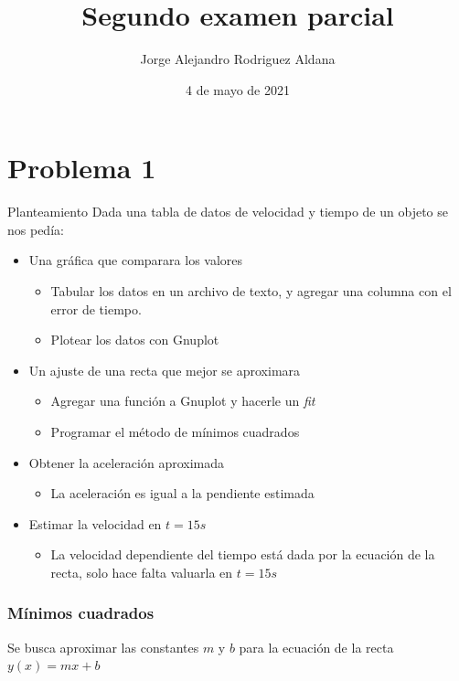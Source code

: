 \documentclass{beamer}
\title{Segundo examen parcial}
\date{4 de mayo de 2021}
\author{Jorge Alejandro Rodriguez Aldana}
\institute{Escuela de Ciencias físicas y matemáticas}
\begin{document}
\maketitle
\section{Problema 1}
\begin{frame}{Planteamiento}
Dada una tabla de datos de velocidad y tiempo de un objeto se nos pedía:

 \begin{itemize}[<+- | alert@+>]
    \item Una gráfica que comparara los valores
    \begin{itemize}
        \item Tabular los datos en un archivo de texto, y agregar una columna con el error de tiempo.
        \item Plotear los datos con Gnuplot
    \end{itemize}
    \item Un ajuste de una recta que mejor se aproximara 
    \begin{itemize}
        \item Agregar una función a Gnuplot y hacerle un \textit{fit}
        \item Programar el método de mínimos cuadrados
    \end{itemize}
    \item Obtener la aceleración aproximada
    \begin{itemize}
        \item La aceleración es igual a la pendiente estimada
    \end{itemize}
    \item Estimar la velocidad en $t=15s$
    \begin{itemize}
        \item La velocidad dependiente del tiempo está dada por la ecuación de la recta, solo hace falta valuarla en $t=15s$
    \end{itemize}
  \end{itemize}
\end{frame}

\begin{frame}
    \frametitle{Mínimos cuadrados}

    Se busca aproximar las constantes $m$ y $b$ para la ecuación de la recta $y(x)=mx+b$
    
    \bigskip


\end{frame}
\end{document}

